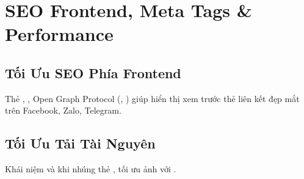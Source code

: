 \chapter{SEO Frontend, Meta Tags \& Performance}
\label{chap:seo_performance}

\section{Tối Ưu SEO Phía Frontend}
Thẻ , , Open Graph Protocol (, ) giúp hiển thị xem trước thẻ liên kết đẹp mắt trên Facebook, Zalo, Telegram.

\section{Tối Ưu Tải Tài Nguyên}
Khái niệm  và  khi nhúng thẻ , tối ưu ảnh với .
